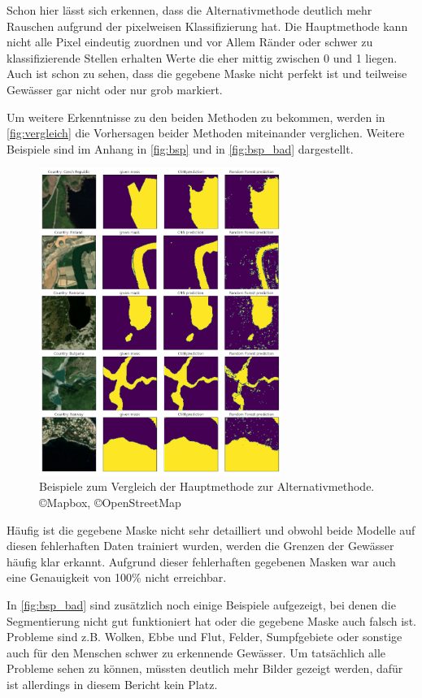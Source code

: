 Schon hier lässt sich erkennen, dass die Alternativmethode deutlich mehr Rauschen aufgrund der pixelweisen Klassifizierung hat.
Die Hauptmethode kann nicht alle Pixel eindeutig zuordnen und vor Allem Ränder oder schwer zu klassifizierende Stellen erhalten Werte die eher mittig zwischen 0 und 1 liegen.
Auch ist schon zu sehen, dass die gegebene Maske nicht perfekt ist und teilweise Gewässer gar nicht oder nur grob markiert.

Um weitere Erkenntnisse zu den beiden Methoden zu bekommen, werden in \autoref{fig:vergleich} die Vorhersagen beider Methoden miteinander verglichen.
Weitere Beispiele sind im Anhang in \autoref{fig:bsp} und in \autoref{fig:bsp_bad} dargestellt.

\begin{figure}
    \centering
    \includegraphics[width=0.7\textwidth]{images/vergleich.png}
    \caption{Beispiele zum Vergleich der Hauptmethode zur Alternativmethode.\\ \copyright Mapbox, \copyright OpenStreetMap}
    \label{fig:vergleich}
\end{figure}

Häufig ist die gegebene Maske nicht sehr detailliert 
und obwohl beide Modelle auf diesen fehlerhaften Daten trainiert wurden,
werden die Grenzen der Gewässer häufig klar erkannt.
Aufgrund dieser fehlerhaften gegebenen Masken war auch eine Genauigkeit von 100\% nicht erreichbar.

In \autoref{fig:bsp_bad} sind zusätzlich noch einige Beispiele aufgezeigt, 
bei denen die Segmentierung nicht gut funktioniert hat 
oder die gegebene Maske auch falsch ist.
Probleme sind z.B. Wolken, Ebbe und Flut, Felder, Sumpfgebiete oder sonstige auch für den Menschen schwer zu erkennende Gewässer.
Um tatsächlich alle Probleme sehen zu können, müssten deutlich mehr Bilder gezeigt werden, dafür ist allerdings in diesem Bericht kein Platz.

